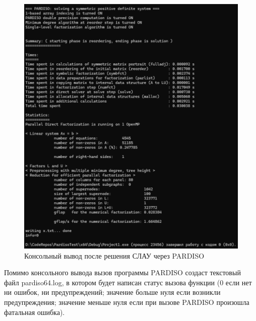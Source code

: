 \begin{figure}
	\centering
	\vspace*{0.7cm}
	\includegraphics[width=1.0\linewidth]{images/resultPardiso.png}
	\caption{Консольный вывод после решения СЛАУ через PARDISO}
	\label{fig:ExamplePARDISO}
\end{figure}

Помимо консольного вывода вызов программы PARDISO создаст текстовый файл pardiso64.log, в котором будет написан статус вызова функции (0 если нет ни ошибок, ни предупреждений; значение больше нуля если возникли предупреждения; значение меньше нуля если при вызове PARDISO произошла фатальная ошибка).



